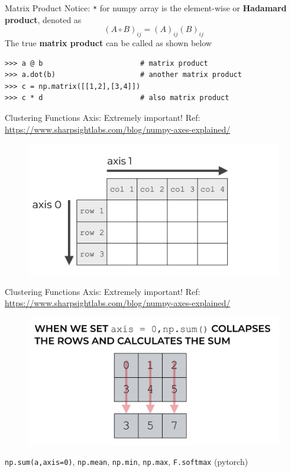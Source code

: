 \documentclass{../TexTemplate/myslide}
\begin{document}
\begin{frame}[fragile]{Matrix Product}
Notice: \verb'*' for numpy array is the element-wise or \textbf{Hadamard product}, denoted as
\[(A\circ B)_{ij}=(A)_{ij}(B)_{ij}\]
\bigskip
The true \textbf{matrix product} can be called as shown below
\begin{lstlisting}
>>> a @ b                       # matrix product
>>> a.dot(b)                    # another matrix product
>>> c = np.matrix([[1,2],[3,4]])
>>> c * d                       # also matrix product
\end{lstlisting}
\end{frame}

\begin{frame}[fragile]{Clustering Functions}
Axis: Extremely important! Ref: \url{https://www.sharpsightlabs.com/blog/numpy-axes-explained/}
\begin{figure}
\centering
\includegraphics[width=0.8\linewidth]{fig/axis1.png}
\end{figure}
\end{frame}

\begin{frame}[fragile]{Clustering Functions}
Axis: Extremely important! Ref: \url{https://www.sharpsightlabs.com/blog/numpy-axes-explained/}
\begin{figure}
\centering
\includegraphics[width=0.8\linewidth]{fig/axis2.png}
\end{figure}
\verb'np.sum(a,axis=0)', \verb'np.mean', \verb'np.min', \verb'np.max', \verb'F.softmax' (pytorch)
\end{frame}
\end{document}
